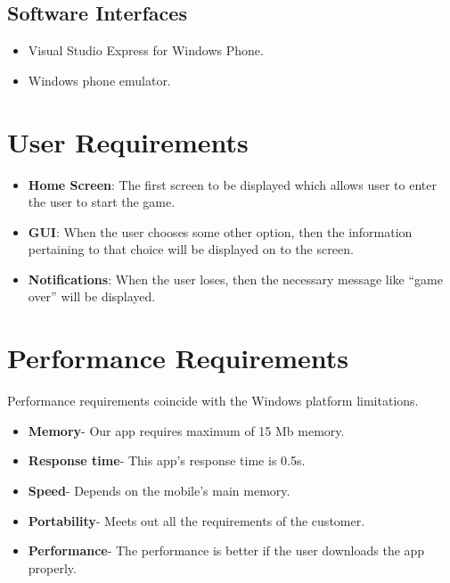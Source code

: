 \subsection{Software Interfaces}
\begin{itemize}
\item \textbf {}Visual Studio Express for Windows Phone.
\item \textbf {}Windows phone emulator.
\end{itemize}

\section{User Requirements}
\begin{itemize}
\item \textbf {Home Screen}: The  first  screen  to be displayed which allows user  to enter the user to start the game. 
\item \textbf {GUI}: When  the  user  chooses  some  other option,  then  the  information  pertaining  to that choice will be displayed on to the screen.
\item \textbf {Notifications}: When  the user loses, then the necessary message like “game over” will be displayed. 
\end{itemize}
\section{Performance Requirements}
\hspace{1cm}
Performance requirements coincide with the Windows platform limitations. 
\begin{itemize}
	\item \textbf {Memory}- Our app requires maximum of 15 Mb memory.
	\item \textbf {Response time}- This app’s response time is 0.5s.
	\item \textbf {Speed}- Depends on the mobile’s main memory.
	\item \textbf {Portability}- Meets out all the requirements of the customer.
	\item \textbf {Performance}- The performance is better if the user downloads the app properly.

\end{itemize}


